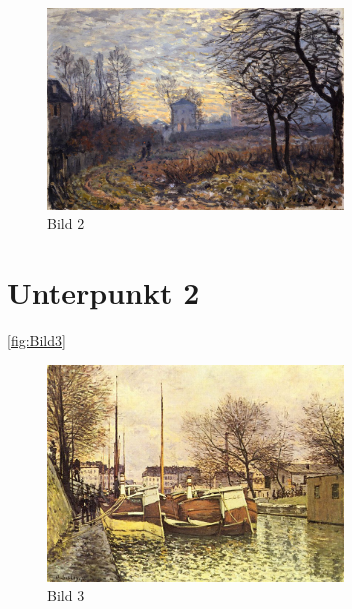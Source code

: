 \documentclass[
	A4paper,
	DIV=9,
	BCOR7mm,
	smallheadings,
	headinclude,
	footinclude,
	headsepline,
	parindent,
	german,
	captions=tableheading,
	abstracton
	]{scrreprt}
\begin{document}
\blindtext[2]{}\autocite{:Wintermantel_Medizintechnik}
\begin{figure}[htbp]
\begin{center}
\includegraphics[width=0.7\textwidth]{Abbildungen/Bild2.jpg}
\caption{Bild 2}
\label{fig:Bild2}
\end{center}
\end{figure}

\blindtext[1]{}\autocite{:Keshk_2014}
\section{Unterpunkt 2}
\blindtext[1]{}\autocite{:Aydin_2009}

\blindtext[1]{}\autoref{fig:Bild3}
\blindtext[1]{}\autocite{:Muelhardt_2013}
\begin{figure}[htbp]
\begin{center}
\includegraphics[width=0.7\textwidth]{Abbildungen/Bild3.jpg}
\caption{Bild 3}
\label{fig:Bild3}
\end{center}
\end{figure}
\end{document}
